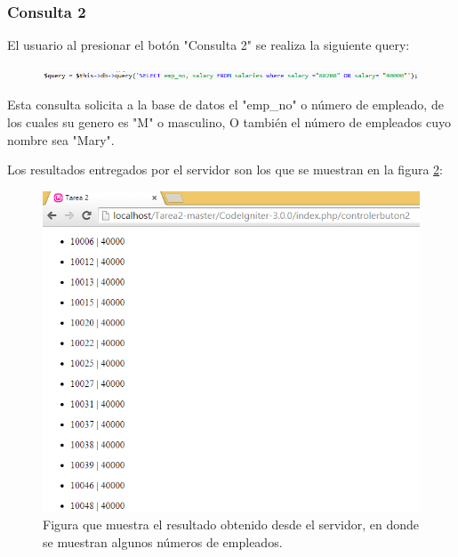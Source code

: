 \subsubsection{Consulta 2}

El usuario al presionar el botón "Consulta 2" se realiza la siguiente query:

\begin{figure}[htb]
	\label{Figura4}
	\begin{center}
		\includegraphics[scale=0.7]{imagenes/query2.png}
	\end{center}
\end{figure}

Esta consulta solicita a la base de datos el "emp\_no" o número de empleado, de los cuales su genero es "M" o masculino, O también el número de empleados cuyo nombre sea "Mary".

Los resultados entregados por el servidor son los que se muestran en la figura \ref{Figura5}:

\begin{figure}[htb]
	\label{Figura5}
	\begin{center}
		\includegraphics[scale=0.7]{imagenes/resultado2.png}
		\caption{Figura que muestra el resultado obtenido desde el servidor, en donde se muestran algunos números de empleados.}
	\end{center}
\end{figure}

